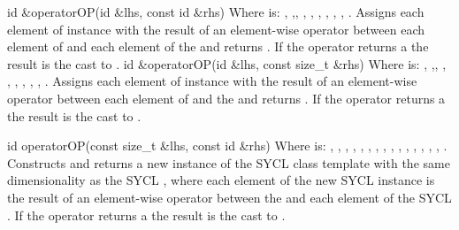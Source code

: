   \addRow
    { id \&operatorOP(id \&lhs, const id \&rhs) }
    {
      Where  is: \codeinline{+=}, \codeinline{-=},\codeinline{
      *=}, \codeinline{/=}, \codeinline{\%=}, \codeinline{<<=}, \codeinline{
      >>=}, \codeinline{\&=}, \codeinline{|=}, \codeinline{^=}.
      \newline
      Assigns each element of   instance with the
      result of an element-wise  operator between each element
      of   and each element of the 
       and returns  . If
      the operator returns a  the result is the cast to
      .
    }
  \addRow
    { id \&operatorOP(id \&lhs, const size_t \&rhs) }
    {
      Where  is: \codeinline{+=}, \codeinline{-=},\codeinline{
      *=}, \codeinline{/=}, \codeinline{\%=}, \codeinline{<<=}, \codeinline{
      >>=}, \codeinline{\&=}, \codeinline{|=}, \codeinline{^=}.
      \newline
      Assigns each element of   instance with the
      result of an element-wise  operator between each element
      of   and the  
      and returns  . If the operator
      returns a  the result is the cast to .
    }

  \addRow
    { id operatorOP(const size_t \&lhs, const id \&rhs) }
    {
      Where  is: \codeinline{+}, \codeinline{-}, \codeinline{*},
      \codeinline{/}, \codeinline{\%}, \codeinline{<<}, \codeinline{>>},
      \codeinline{\&}, \codeinline{|}, \codeinline{^},
      \codeinline{\&\&}, \codeinline{||},
      \codeinline{<}, \codeinline{>}, \codeinline{<=},
      \codeinline{>=}.
      \newline
      Constructs and returns a new instance of the SYCL  class
      template with the same dimensionality as the  SYCL
      , where each element of the new SYCL 
      instance is the result of an element-wise  operator between
      the   and each element of the
       SYCL . If the operator returns a
       the result is the cast to .
    }
\completeTable

